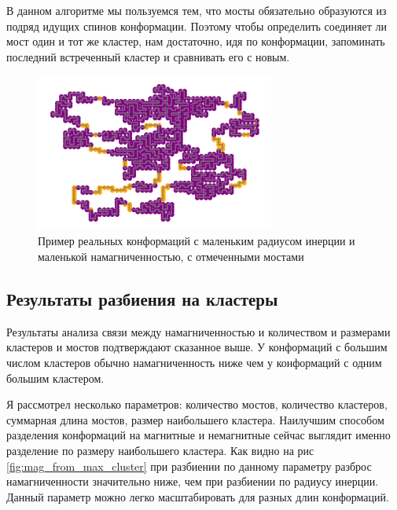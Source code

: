 В данном алгоритме мы пользуемся тем, что мосты обязательно образуются из подряд идущих спинов конформации. Поэтому чтобы определить соединяет ли мост один и тот же кластер, нам достаточно, идя по конформации, запоминать последний встреченный кластер и сравнивать его с новым.

\begin{figure}[h]
	\centering
	\includegraphics[width=0.70\textwidth]{../images/bridges_example_1.png}  
	\caption{Пример реальных конформаций с маленьким радиусом инерции и маленькой намагниченностью, с отмеченными мостами}
	\label{fig:clusters_and_bridges}
\end{figure}


\subsection{Результаты разбиения на кластеры}
Результаты анализа связи между намагниченностью и количеством и размерами кластеров и мостов подтверждают сказанное выше. У конформаций с большим числом кластеров обычно намагниченность ниже чем у конформаций с одним большим кластером. 

Я рассмотрел несколько параметров: количество мостов, количество кластеров, суммарная длина мостов, размер наибольшего кластера. Наилучшим способом разделения конформаций на магнитные и немагнитные сейчас выглядит именно разделение по размеру наибольшего кластера. Как видно на рис \ref{fig:mag_from_max_cluster} при разбиении по данному параметру разброс намагниченности значительно ниже, чем при разбиении по радиусу инерции. Данный параметр можно легко масштабировать для разных длин конформаций.

